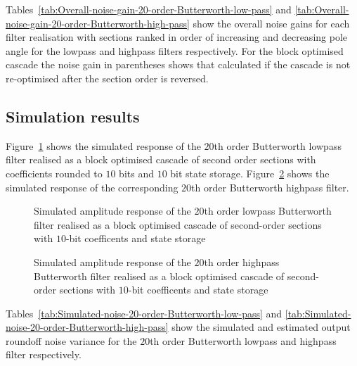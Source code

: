 \documentclass[a4paper,twoside,10pt,english]{report}
\begin{document}
Tables~\ref{tab:Overall-noise-gain-20-order-Butterworth-low-pass} and
\ref{tab:Overall-noise-gain-20-order-Butterworth-high-pass} show the
overall noise gains for each filter realisation with sections ranked
in order of increasing and decreasing pole angle for the lowpass and highpass
filters respectively. For the block optimised
cascade the noise gain in parentheses shows that calculated if the cascade is
not re-optimised after the section order is reversed.


\subsection{Simulation results}
Figure~\ref{fig:order-20-low-butterworth-second-order-cascade-output-response}
shows the simulated response of the $20$th order Butterworth lowpass filter
realised as a block optimised cascade of second order sections with
coefficients rounded to $10$ bits and $10$ bit state storage. 
Figure~\ref{fig:order-20-high-butterworth-second-order-cascade-output-response}
shows the simulated response of the corresponding $20$th order Butterworth
highpass filter. 
\begin{figure}[bhpt]
\begin{center}
\scalebox{0.7}{}
\caption{Simulated amplitude response of the $20$th order lowpass Butterworth
  filter realised as a block optimised cascade of second-order sections with
  $10$-bit coefficents and state storage} 
\label{fig:order-20-low-butterworth-second-order-cascade-output-response}
\end{center}
\end{figure}
\begin{figure}[bhpt]
\begin{center}
\scalebox{0.7}{}
\caption{Simulated amplitude response of the $20$th order highpass Butterworth
  filter realised as a block optimised cascade of second-order sections with
  $10$-bit coefficents and state storage} 
\label{fig:order-20-high-butterworth-second-order-cascade-output-response}
\end{center}
\end{figure}
Tables~\ref{tab:Simulated-noise-20-order-Butterworth-low-pass} and
\ref{tab:Simulated-noise-20-order-Butterworth-high-pass} show the
simulated and estimated output roundoff noise variance for the $20$th order
Butterworth lowpass and highpass filter respectively.


\end{document}
